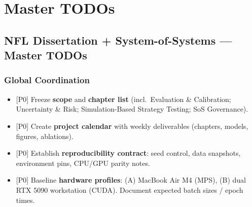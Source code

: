\chapter*{Master TODOs}

\newcommand{\block}[1]{\par\noindent\textbf{#1}\par\vspace{0.25em}}
\newcommand{\milestone}[1]{\vspace{0.5em}\noindent\textbf{\large #1}\par\vspace{0.25em}\hrule\vspace{0.5em}}
\newcommand{\done}{\textcolor{green!60!black}{\(\checkmark\)}}
\newcommand{\wip}{\textcolor{orange!80!black}{(WIP)}}
\newcommand{\prio}[1]{\textcolor{blue!70!black}{[#1]}}

\begingroup
\RaggedRight\sloppy{}

\section*{NFL Dissertation + System-of-Systems — Master TODOs}

\subsection*{Global Coordination}
\begin{itemize}
  \item \prio{P0} Freeze \textbf{scope} and \textbf{chapter list} (incl.\ Evaluation \& Calibration; Uncertainty \& Risk; Simulation-Based Strategy Testing; SoS Governance).
  \item \prio{P0} Create \textbf{project calendar} with weekly deliverables (chapters, models, figures, ablations).
  \item \prio{P0} Establish \textbf{reproducibility contract}: seed control, data snapshots, environment pins, CPU/GPU parity notes.
  \item \prio{P0} Baseline \textbf{hardware profiles}: (A) MacBook Air M4 (MPS), (B) dual RTX 5090 workstation (CUDA). Document expected batch sizes / epoch times.
\end{itemize}

